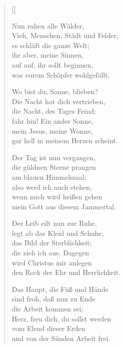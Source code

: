 \begin{multicols}{2}
\settowidth{\versewidth}{Wo bist du, Sonne, blieben?}
\begin{verse}[\versewidth]

 Nun ruhen alle Wälder,\\
Vieh, Menschen, Städt und Felder,\\
es schläft die ganze Welt;\\
ihr aber, meine Sinnen,\\
auf auf, ihr sollt beginnen,\\
was eurem Schöpfer wohlgefällt.

 Wo bist du, Sonne, blieben?\\
Die Nacht hat dich vertrieben,\\
die Nacht, des Tages Feind;\\
fahr hin! Ein ander Sonne,\\
mein Jesus, meine Wonne,\\
gar hell in meinem Herzen scheint.

 Der Tag ist nun vergangen,\\
die güldnen Sterne prangen\\
am blauen Himmelssaal;\\
also werd ich auch stehen,\\
wenn mich wird heißen gehen\\
mein Gott aus diesem Jammertal.

 Der Leib eilt nun zur Ruhe,\\
legt ab das Kleid und Schuhe,\\
das Bild der Sterblichkeit;\\
die zieh ich aus. Dagegen\\
wird Christus mir anlegen\\
den Rock der Ehr und Herrlichkeit.

 Das Haupt, die Füß und Hände\\
sind froh, daß nun zu Ende\\
die Arbeit kommen sei;\\
Herz, freu dich, du sollst werden\\
vom Elend dieser Erden\\
und von der Sünden Arbeit frei.


\end{verse}
\end{multicols}
